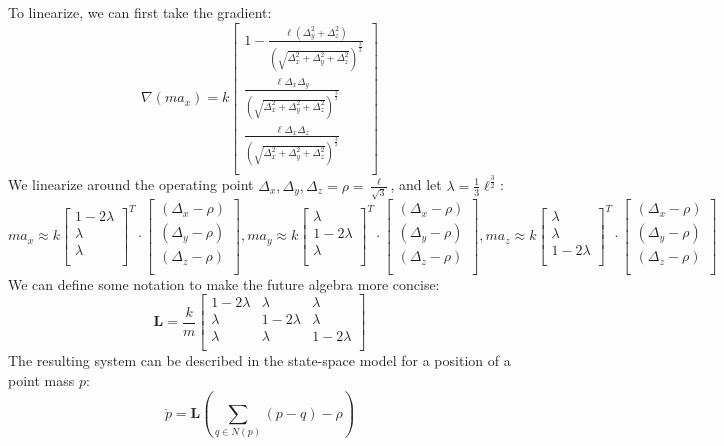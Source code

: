 To linearize, we can first take the gradient:
\[
\nabla(m a_x) = k \begin{bmatrix}
    1 - \frac{\ell (\Delta_y^2 + \Delta_z^2) }{(\sqrt{\Delta_x^2 + \Delta_y^2 + \Delta_z^2}) ^\frac{3}{2}} \\
    \frac{\ell \Delta_x \Delta_y }{(\sqrt{\Delta_x^2 + \Delta_y^2 + \Delta_z^2}) ^\frac{3}{2}} \\
    \frac{\ell \Delta_x \Delta_z }{(\sqrt{\Delta_x^2 + \Delta_y^2 + \Delta_z^2}) ^\frac{3}{2}} \\
\end{bmatrix} 
\]
We linearize around the operating point $\Delta_x, \Delta_y,\Delta_z = \rho = \frac{\ell}{\sqrt{3}}$, and let $\lambda = \frac{1}{3}\ell^{\frac{3}{2}}$:
\[
m a_x \approx  k \begin{bmatrix}
    1 - 2 \lambda \\
    \lambda \\
    \lambda \\
\end{bmatrix}^T \cdot \begin{bmatrix}
    (\Delta_x - \rho) \\
    (\Delta_y - \rho)\\
    (\Delta_z - \rho) \\
\end{bmatrix}, m a_y \approx  k \begin{bmatrix}
    \lambda \\
    1-2\lambda \\
    \lambda \\
\end{bmatrix}^T \cdot \begin{bmatrix}
    (\Delta_x - \rho) \\
    (\Delta_y - \rho)\\
    (\Delta_z - \rho) \\
\end{bmatrix}, m a_z \approx  k \begin{bmatrix}
    \lambda \\
    \lambda \\
    1-2\lambda \\
\end{bmatrix}^T \cdot \begin{bmatrix}
    (\Delta_x - \rho) \\
    (\Delta_y - \rho)\\
    (\Delta_z - \rho) \\
\end{bmatrix}
\]
We can define some notation to make the future algebra more concise:
\[
\mathbf{L} = \frac{k}{m} \begin{bmatrix}
   1- 2\lambda & \lambda & \lambda  \\
    \lambda & 1- 2\lambda & \lambda \\
    \lambda & \lambda  & 1-2\lambda \\
\end{bmatrix}
\]
The resulting system can be described in the state-space model for a position of a point mass $p$:
\begin{equation}
\ddot{p} = \mathbf{L} (\sum_{q \in N(p) }  (p - q) - \rho)
\end{equation}


